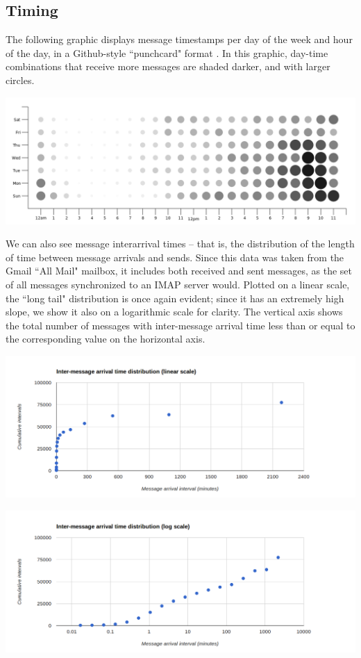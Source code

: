 \documentclass[pageno]{jpaper}
\begin{document}
\subsection{Timing}

The following graphic displays message timestamps per day of the week and hour of the day, in a Github-style ``punchcard" format \cite{punchcard}. In this graphic, day-time combinations that receive more messages are shaded darker, and with larger circles.

\includegraphics[width=\textwidth]{punchcard}

We can also see message interarrival times \--- that is, the distribution of the length of time between message arrivals and sends. Since this data was taken from the Gmail ``All Mail" mailbox, it includes both received and sent messages, as the set of all messages synchronized to an IMAP server would. Plotted on a linear scale, the ``long tail" distribution is once again evident; since it has an extremely high slope, we show it also on a logarithmic scale for clarity. The vertical axis shows the total number of messages with inter-message arrival time less than or equal to the corresponding value on the horizontal axis.

\includegraphics[width=\textwidth]{intermessagelinear}

\includegraphics[width=\textwidth]{intermessagelog}
\end{document}
